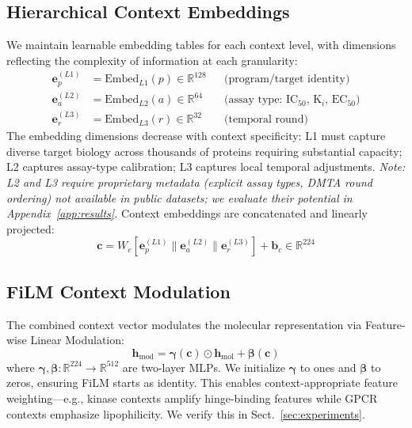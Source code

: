 \documentclass[runningheads]{llncs}
\newcommand{\hmol}{\mathbf{h}_{\text{mol}}}
\newcommand{\hmod}{\mathbf{h}_{\text{mod}}}
\begin{document}
\subsection{Hierarchical Context Embeddings}

We maintain learnable embedding tables for each context level, with dimensions reflecting the complexity of information at each granularity:
\begin{align}
    \mathbf{e}_p^{(L1)} &= \text{Embed}_{L1}(p) \in \mathbb{R}^{128} && \text{(program/target identity)} \\
    \mathbf{e}_a^{(L2)} &= \text{Embed}_{L2}(a) \in \mathbb{R}^{64} && \text{(assay type: IC$_{50}$, K$_i$, EC$_{50}$)} \\
    \mathbf{e}_r^{(L3)} &= \text{Embed}_{L3}(r) \in \mathbb{R}^{32} && \text{(temporal round)}
\end{align}
The embedding dimensions decrease with context specificity: L1 must capture diverse target biology across thousands of proteins requiring substantial capacity; L2 captures assay-type calibration; L3 captures local temporal adjustments. \textit{Note: L2 and L3 require proprietary metadata (explicit assay types, DMTA round ordering) not available in public datasets; we evaluate their potential in Appendix~\ref{app:results}.} Context embeddings are concatenated and linearly projected:
\begin{equation}
    \mathbf{c} = W_c [\mathbf{e}_p^{(L1)} \| \mathbf{e}_a^{(L2)} \| \mathbf{e}_r^{(L3)}] + \mathbf{b}_c \in \mathbb{R}^{224}
\end{equation}

\subsection{FiLM Context Modulation}

The combined context vector modulates the molecular representation via Feature-wise Linear Modulation:
\begin{equation}
    \hmod = \boldsymbol{\gamma}(\mathbf{c}) \odot \hmol + \boldsymbol{\beta}(\mathbf{c})
    \label{eq:film}
\end{equation}
where $\boldsymbol{\gamma}, \boldsymbol{\beta}: \mathbb{R}^{224} \rightarrow \mathbb{R}^{512}$ are two-layer MLPs. We initialize $\boldsymbol{\gamma}$ to ones and $\boldsymbol{\beta}$ to zeros, ensuring FiLM starts as identity. This enables context-appropriate feature weighting---e.g., kinase contexts amplify hinge-binding features while GPCR contexts emphasize lipophilicity. We verify this in Sect.~\ref{sec:experiments}.
\end{document}
